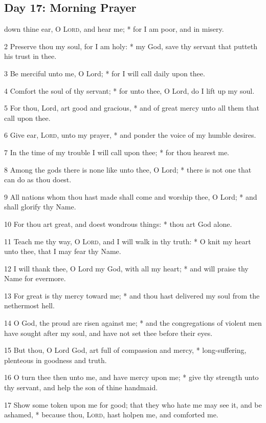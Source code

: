 \subsection{Day 17: Morning Prayer}
 down thine ear, O {\textsc{Lord}}, and hear me; * for I am poor, and in misery.\par
2 Preserve thou my soul, for I am holy: * my God, save thy servant that putteth his trust in thee.\par
3 Be merciful unto me, O Lord; * for I will call daily upon thee.\par
4 Comfort the soul of thy servant; * for unto thee, O Lord, do I lift up my soul.\par
5 For thou, Lord, art good and gracious, * and of great mercy unto all them that call upon thee.\par
6 Give ear, {\textsc{Lord}}, unto my prayer, * and ponder the voice of my humble desires.\par
7 In the time of my trouble I will call upon thee; * for thou hearest me.\par
8 Among the gods there is none like unto thee, O Lord; * there is not one that can do as thou doest.\par
9 All nations whom thou hast made shall come and worship thee, O Lord; * and shall glorify thy Name.\par
10 For thou art great, and doest wondrous things: * thou art God alone.\par
11 Teach me thy way, O {\textsc{Lord}}, and I will walk in thy truth: * O knit my heart unto thee, that I may fear thy Name.\par
12 I will thank thee, O Lord my God, with all my heart; * and will praise thy Name for evermore.\par
13 For great is thy mercy toward me; * and thou hast delivered my soul from the nethermost hell.\par
14 O God, the proud are risen against me; * and the congregations of violent men have sought after my soul, and have not set thee before their eyes.\par
15 But thou, O Lord God, art full of compassion and mercy, * long-suffering, plenteous in goodness and truth.\par
16 O turn thee then unto me, and have mercy upon me; * give thy strength unto thy servant, and help the son of thine handmaid.\par
17 Show some token upon me for good; that they who hate me may see it, and be ashamed, * because thou, {\textsc{Lord}}, hast holpen me, and comforted me.
